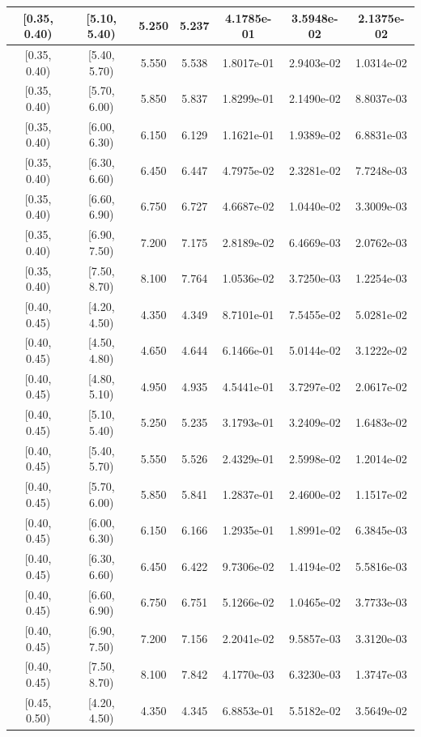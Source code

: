 \begin{longtable}{|c|c|c|c|c|c|c|}
\hline
[0.35, 0.40) & [5.10, 5.40) & 5.250 & 5.237 & 4.1785e-01 & 3.5948e-02 & 2.1375e-02 \\ 
\hline
[0.35, 0.40) & [5.40, 5.70) & 5.550 & 5.538 & 1.8017e-01 & 2.9403e-02 & 1.0314e-02 \\ 
\hline
[0.35, 0.40) & [5.70, 6.00) & 5.850 & 5.837 & 1.8299e-01 & 2.1490e-02 & 8.8037e-03 \\ 
\hline
[0.35, 0.40) & [6.00, 6.30) & 6.150 & 6.129 & 1.1621e-01 & 1.9389e-02 & 6.8831e-03 \\ 
\hline
[0.35, 0.40) & [6.30, 6.60) & 6.450 & 6.447 & 4.7975e-02 & 2.3281e-02 & 7.7248e-03 \\ 
\hline
[0.35, 0.40) & [6.60, 6.90) & 6.750 & 6.727 & 4.6687e-02 & 1.0440e-02 & 3.3009e-03 \\ 
\hline
[0.35, 0.40) & [6.90, 7.50) & 7.200 & 7.175 & 2.8189e-02 & 6.4669e-03 & 2.0762e-03 \\ 
\hline
[0.35, 0.40) & [7.50, 8.70) & 8.100 & 7.764 & 1.0536e-02 & 3.7250e-03 & 1.2254e-03 \\ 
\hline
[0.40, 0.45) & [4.20, 4.50) & 4.350 & 4.349 & 8.7101e-01 & 7.5455e-02 & 5.0281e-02 \\ 
\hline
[0.40, 0.45) & [4.50, 4.80) & 4.650 & 4.644 & 6.1466e-01 & 5.0144e-02 & 3.1222e-02 \\ 
\hline
[0.40, 0.45) & [4.80, 5.10) & 4.950 & 4.935 & 4.5441e-01 & 3.7297e-02 & 2.0617e-02 \\ 
\hline
[0.40, 0.45) & [5.10, 5.40) & 5.250 & 5.235 & 3.1793e-01 & 3.2409e-02 & 1.6483e-02 \\ 
\hline
[0.40, 0.45) & [5.40, 5.70) & 5.550 & 5.526 & 2.4329e-01 & 2.5998e-02 & 1.2014e-02 \\ 
\hline
[0.40, 0.45) & [5.70, 6.00) & 5.850 & 5.841 & 1.2837e-01 & 2.4600e-02 & 1.1517e-02 \\ 
\hline
[0.40, 0.45) & [6.00, 6.30) & 6.150 & 6.166 & 1.2935e-01 & 1.8991e-02 & 6.3845e-03 \\ 
\hline
[0.40, 0.45) & [6.30, 6.60) & 6.450 & 6.422 & 9.7306e-02 & 1.4194e-02 & 5.5816e-03 \\ 
\hline
[0.40, 0.45) & [6.60, 6.90) & 6.750 & 6.751 & 5.1266e-02 & 1.0465e-02 & 3.7733e-03 \\ 
\hline
[0.40, 0.45) & [6.90, 7.50) & 7.200 & 7.156 & 2.2041e-02 & 9.5857e-03 & 3.3120e-03 \\ 
\hline
[0.40, 0.45) & [7.50, 8.70) & 8.100 & 7.842 & 4.1770e-03 & 6.3230e-03 & 1.3747e-03 \\ 
\hline
[0.45, 0.50) & [4.20, 4.50) & 4.350 & 4.345 & 6.8853e-01 & 5.5182e-02 & 3.5649e-02 \\ 

\end{longtable}
